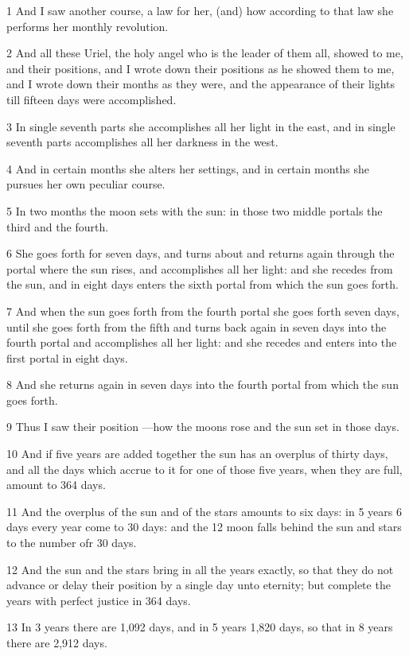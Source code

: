 \par 1 And I saw another course, a law for her, (and) how according to that law she performs her monthly revolution.
\par 2 And all these Uriel, the holy angel who is the leader of them all, showed to me, and their positions, and I wrote down their positions as he showed them to me, and I wrote down their months as they were, and the appearance of their lights till fifteen days were accomplished.
\par 3 In single seventh parts she accomplishes all her light in the east, and in single seventh parts accomplishes all her darkness in the west.
\par 4 And in certain months she alters her settings, and in certain months she pursues her own peculiar course.
\par 5 In two months the moon sets with the sun: in those two middle portals the third and the fourth.
\par 6 She goes forth for seven days, and turns about and returns again through the portal where the sun rises, and accomplishes all her light: and she recedes from the sun, and in eight days enters the sixth portal from which the sun goes forth.
\par 7 And when the sun goes forth from the fourth portal she goes forth seven days, until she goes forth from the fifth and turns back again in seven days into the fourth portal and accomplishes all her light: and she recedes and enters into the first portal in eight days.
\par 8 And she returns again in seven days into the fourth portal from which the sun goes forth.
\par 9 Thus I saw their position —how the moons rose and the sun set in those days.
\par 10 And if five years are added together the sun has an overplus of thirty days, and all the days which accrue to it for one of those five years, when they are full, amount to 364 days.
\par 11 And the overplus of the sun and of the stars amounts to six days: in 5 years 6 days every year come to 30 days: and the 12 moon falls behind the sun and stars to the number ofr 30 days. 
\par 12 And the sun and the stars bring in all the years exactly, so that they do not advance or delay their position by a single day unto eternity; but complete the years with perfect justice in 364 days.
\par 13 In 3 years there are 1,092 days, and in 5 years 1,820 days, so that in 8 years there are 2,912 days.
